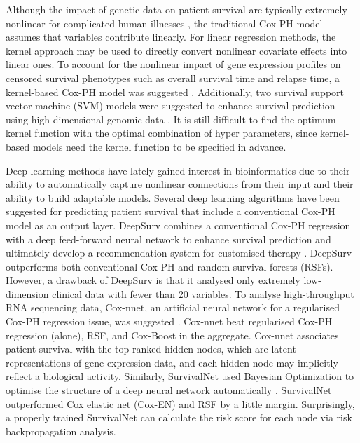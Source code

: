 \documentclass[10pt,twocolumn,twoside,lineno]{gsajnl}
\begin{document}
Although the impact of genetic data on patient survival are typically extremely nonlinear for complicated human illnesses \citep{MALLAVARAPU202024}, the traditional Cox-PH model assumes that variables contribute linearly. For linear regression methods, the kernel approach may be used to directly convert nonlinear covariate effects into linear ones. To account for the nonlinear impact of gene expression profiles on censored survival phenotypes such as overall survival time and relapse time, a kernel-based Cox-PH model was suggested \citep{LI2002}. Additionally, two survival support vector machine (SVM) models were suggested to enhance survival prediction using high-dimensional genomic data \citep{10.1093/bioinformatics/btn253}. It is still difficult to find the optimum kernel function with the optimal combination of hyper parameters, since kernel-based models need the kernel function to be specified in advance.



Deep learning methods have lately gained interest in bioinformatics due to their ability to automatically capture nonlinear connections from their input and their ability to build adaptable models. Several deep learning algorithms have been suggested for predicting patient survival that include a conventional Cox-PH model as an output layer. DeepSurv combines a conventional Cox-PH regression with a deep feed-forward neural network to enhance survival prediction and ultimately develop a recommendation system for customised therapy \citep{Katzman2018}. DeepSurv outperforms both conventional Cox-PH and random survival forests (RSFs). However, a drawback of DeepSurv is that it analysed only extremely low-dimension clinical data with fewer than 20 variables. To analyse high-throughput RNA sequencing data, Cox-nnet, an artificial neural network for a regularised Cox-PH regression issue, was suggested \citep{Ching2018}. Cox-nnet beat regularised Cox-PH regression (alone), RSF, and Cox-Boost in the aggregate. Cox-nnet associates patient survival with the top-ranked hidden nodes, which are latent representations of gene expression data, and each hidden node may implicitly reflect a biological activity. Similarly, SurvivalNet used Bayesian Optimization to optimise the structure of a deep neural network automatically \citep{Yousefi2017}. SurvivalNet outperformed Cox elastic net (Cox-EN) and RSF by a little margin. Surprisingly, a properly trained SurvivalNet can calculate the risk score for each node via risk backpropagation analysis.
\end{document}
